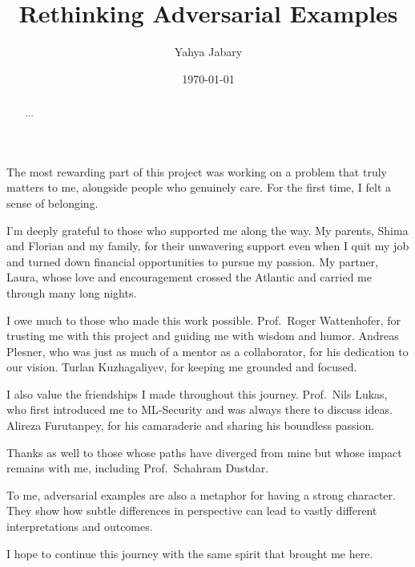 \documentclass[a4paper, oneside]{discothesis}
\title{Rethinking Adversarial Examples}
\author{Yahya Jabary}
\institute{Computer Engineering and Networks Laboratory \\[2pt] ETH Zürich}
\date{\today}
\begin{document}
\frontmatter
\maketitle

\cleardoublepage

\begin{acknowledgements}
	The most rewarding part of this project was working on a problem that truly matters to me, alongside people who genuinely care. For the first time, I felt a sense of belonging.

	I'm deeply grateful to those who supported me along the way. My parents, Shima and Florian and my family, for their unwavering support \textendash{} even when I quit my job and turned down financial opportunities to pursue my passion. My partner, Laura, whose love and encouragement crossed the Atlantic and carried me through many long nights.
	
	I owe much to those who made this work possible. Prof.\ Roger Wattenhofer, for trusting me with this project and guiding me with wisdom and humor. Andreas Plesner, who was just as much of a mentor as a collaborator, for his dedication to our vision. Turlan Kuzhagaliyev, for keeping me grounded and focused.

	I also value the friendships I made throughout this journey. Prof.\ Nils Lukas, who first introduced me to ML-Security and was always there to discuss ideas. Alireza Furutanpey, for his camaraderie and sharing his boundless passion.

	Thanks as well to those whose paths have diverged from mine but whose impact remains with me, including Prof.\ Schahram Dustdar. %

	To me, adversarial examples are also a metaphor for having a strong character. They show how subtle differences in perspective can lead to vastly different interpretations and outcomes.
	
	I hope to continue this journey with the same spirit that brought me here.
\end{acknowledgements}

\begin{abstract}
	...
\end{abstract}
\end{document}
